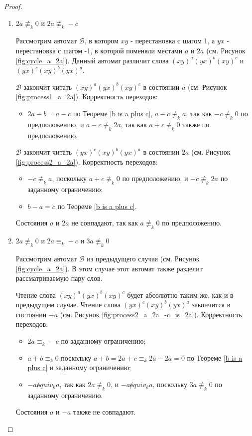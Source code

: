 \begin{proof}
\begin{enumerate}
			\item $2a \not \equiv_k 0$ и $2a \not \equiv_k -c$
			
			Рассмотрим автомат $\mathscr{B}$, в котором $xy$ - перестановка с шагом 1, а $yx$ - перестановка с шагом -1, в которой поменяли местами $a$ и $2a$ (см. Рисунок \ref{fig:cycle_a_2a}). Данный автомат различит слова $(xy)^a(yx)^b(xy)^c$ и $(yx)^c(xy)^b(yx)^a$.
			
			$\mathscr{B}$ закончит читать $(xy)^a(yx)^b(xy)^c$ в состоянии $a$ (см. Рисунок \ref{fig:process1_a_2a}).
			Корректность переходов:
			\begin{itemize}
				\item $2a-b = a-c$ по Теореме \ref{b is a plus c}, $a-c \not \equiv_k a$, так как $-c \not \equiv_k 0$ по предположению, и $a-c \not \equiv_k 2a$, так как $a+c \not \equiv_k 0$ также по предположению.
			\end{itemize}
		
			$\mathscr{B}$ закончит читать $(yx)^c(xy)^b(yx)^a$ в состоянии $2a$ (см. Рисунок \ref{fig:process2_a_2a}).
			Корректность переходов:
			\begin{itemize}
				\item $-c \not \equiv_k a$, поскольку $a+c \not \equiv_k 0$ по предположению, и $-c \not \equiv_k 2a$ по заданному ограничению;
				\item $b-a = c$ по Теореме \ref{b is a plus c}.
			\end{itemize}
			Состояния $a$ и $2a$ не совпадают, так как $a \not \equiv_k 0$ по предположению.
			
			\item $2a \not \equiv_k 0$ и $2a \equiv_k -c$ и $3a \not \equiv_k 0$
			
			Рассмотрим автомат $\mathscr{B}$ из предыдущего случая (см. Рисунок \ref{fig:cycle_a_2a}). В этом случае этот автомат также разделит рассматриваемую пару слов.
			
			Чтение слова $(xy)^a(yx)^b(xy)^c$ будет абсолютно таким же, как и в предыдущем случае.
			Чтение слова $(yx)^c(xy)^b(yx)^a$ закончится в состоянии $-a$ (см. Рисунок \ref{fig:process2_a_2a_-c_is_2a}).
			Корректность переходов:
			\begin{itemize}
				\item $2a \equiv_k -c$ по заданному ограничению;
				\item $a+b \equiv_k 0$ поскольку $a+b = 2a+c \equiv_k 2a - 2a = 0$ по Теореме \ref{b is a plus c} и заданному ограничению;
				\item $-a \not equiv_k a$, так как $2a \not \equiv_k 0$, и $-a \not equiv_k a$, поскольку $3a \not \equiv_k 0$ по заданному ограничению.
			\end{itemize}
			Состояния $a$ и $-a$ также не совпадают.
			

\end{enumerate}
\end{proof}

